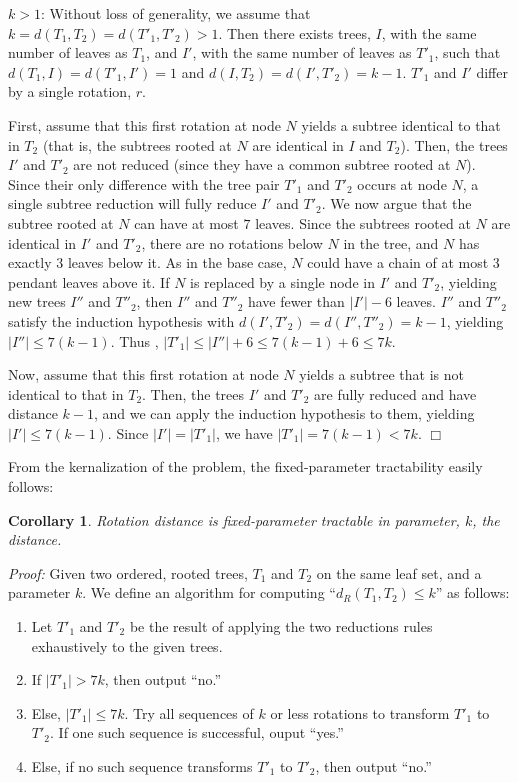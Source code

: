 \documentclass[12pt]{article}
\newtheorem{corollary}[theorem]{Corollary}
\begin{document}
$k>1$:  Without loss of generality, we assume that 
$k = d(T_1,T_2) = d(T'_1,T'_2)  > 1$.
Then there exists trees, $I$, with the same number of
leaves as $T_1$, and $I'$, with the same number of
leaves as $T'_1$, such that 
$d(T_1,I) = d(T'_1,I') =1$ and $d(I,T_2) = d(I',T'_2) = k-1$.
$T'_1$ and $I'$ differ by a single rotation, $r$.  

First, assume that this first rotation at node $N$ yields
a subtree identical to that in $T_2$ (that is, the subtrees 
rooted at $N$ are identical in $I$ and $T_2$).  Then, 
the trees $I'$ and $T'_2$ are not reduced (since they
have a common subtree rooted at $N$).  Since their
only difference with the tree pair $T'_1$  and $T'_2$
occurs at node $N$, a single subtree reduction will 
fully reduce $I'$ and $T'_2$.  We now argue that the 
subtree rooted at $N$ can have at most $7$ leaves.
Since the subtrees rooted at $N$ are identical in $I'$
and $T'_2$, there are no rotations below $N$ in the
tree, and $N$ has exactly $3$ leaves below it.  
As in the base case, $N$
could have a chain of at most 3 pendant leaves above
it.  If $N$ is replaced by a single node in $I'$ and $T'_2$, 
yielding new trees $I''$ and $T''_2$, then $I''$ and $T''_2$
have fewer than $|I'| -6$ leaves.  $I''$ and $T''_2$
satisfy the induction hypothesis with
$d(I',T'_2) = d(I'',T''_2) = k-1$, yielding $|I''| \leq 7(k-1)$.
Thus , $|T'_1| \leq |I''| + 6 \leq 7(k-1) + 6 \leq 7k$.

Now, assume that this first rotation at node $N$ yields
a subtree that is not identical to that in $T_2$.  Then,
the trees $I'$ and $T'_2$ are fully reduced and have
distance $k-1$, and we can
apply the induction hypothesis to them, yielding 
$|I'| \leq 7(k-1)$.  Since $|I'| = |T'_1|$, we have
$|T'_1| = 7(k-1) < 7k$.
\hfill $\Box$

From the kernalization of the problem, the fixed-parameter
tractability easily follows:

\begin{corollary} 
\label{mainthm} Rotation distance is fixed-parameter
tractable in parameter, $k$, the distance.
\end{corollary}

{\em Proof:}
Given two ordered, rooted trees, $T_1$ and $T_2$ on the
same leaf set, and a parameter $k$.  We define an algorithm
for computing ``$d_R(T_1,T_2) \leq k$'' as follows:
\begin{enumerate}
\itemsep 0pt
	\item Let $T'_1$ and $T'_2$ be the result of applying 
		the two reductions rules exhaustively to the given trees. 
	\item If $|T'_1| > 7k$, then output ``{\sc no}.''
	\item Else, $|T'_1| \leq 7k$.  Try all sequences of $k$
		or less rotations to transform $T'_1$ to $T'_2$.
		If one such sequence is successful, ouput ``{\sc yes}.''
	\item Else, if no such sequence transforms $T'_1$ to $T'_2$, 
		then output ``{\sc no}.''
\end{enumerate}
 
\end{document}
